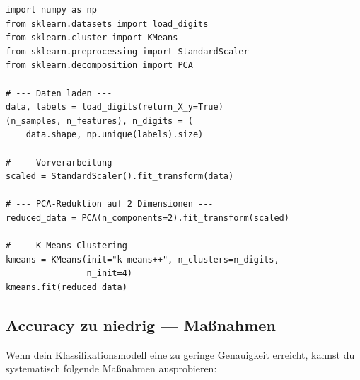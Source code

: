 \begin{propertylist}[Faustregeln]
\end{propertylist}
\begin{codebox}
\begin{lstlisting}[style=CodeExpert]
import numpy as np
from sklearn.datasets import load_digits
from sklearn.cluster import KMeans
from sklearn.preprocessing import StandardScaler
from sklearn.decomposition import PCA

# --- Daten laden ---
data, labels = load_digits(return_X_y=True)
(n_samples, n_features), n_digits = (
    data.shape, np.unique(labels).size)

# --- Vorverarbeitung ---
scaled = StandardScaler().fit_transform(data)

# --- PCA-Reduktion auf 2 Dimensionen ---
reduced_data = PCA(n_components=2).fit_transform(scaled)

# --- K-Means Clustering ---
kmeans = KMeans(init="k-means++", n_clusters=n_digits,
                n_init=4)
kmeans.fit(reduced_data)
\end{lstlisting}
\end{codebox}



\subsection{Accuracy zu niedrig — Maßnahmen}\label{sec:08-accuracy-zu-niedrig}

\begin{contentbox}
Wenn dein Klassifikationsmodell eine zu geringe Genauigkeit erreicht, kannst du systematisch folgende Maßnahmen ausprobieren:
\end{contentbox}

